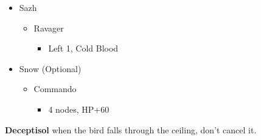 \begin{multicols}{2}
\begin{menu}
\begin{itemize}
    \crystarium
    \begin{itemize}
        \item Sazh
        \begin{itemize}
            \item Ravager
            \begin{itemize}
                \item Left 1, Cold Blood
            \end{itemize}
        \end{itemize}
        \item Snow (Optional)
        \begin{itemize}
            \item Commando
            \begin{itemize}
                \item 4 nodes, HP+60
            \end{itemize}
        \end{itemize}
    \end{itemize}
\end{itemize}
\end{menu}

\textbf{Deceptisol} when the bird falls through the ceiling, don't cancel it.


\end{multicols}
